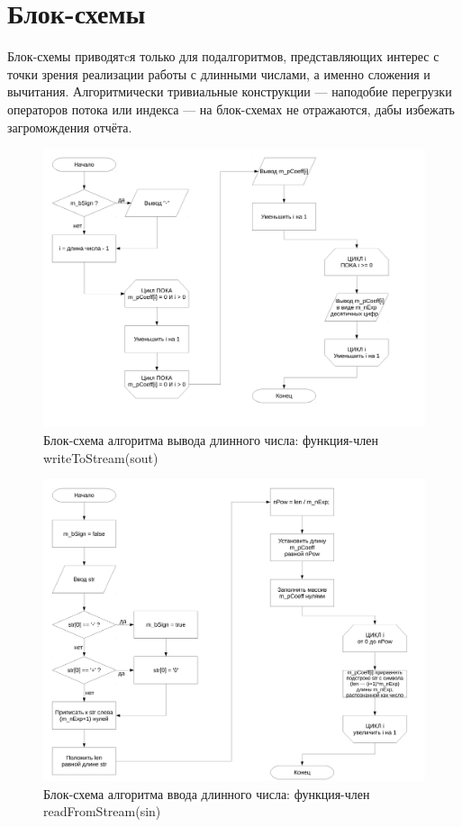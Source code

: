 \documentclass[a4paper,12pt]{article} %
\begin{document}



\section*{Блок-схемы}

Блок-схемы приводятcя только для подалгоритмов, представляющих интерес с точки зрения реализации работы с длинными числами,
а именно сложения и вычитания.
Алгоритмически тривиальные конструкции --- наподобие перегрузки операторов потока или индекса --- на блок-схемах не отражаются,
дабы избежать загромождения отчёта.

\begin{figure}[ht]
	\includegraphics[width=\textwidth]{lr1_writeToStream.pdf}
	\caption{Блок-схема алгоритма вывода длинного числа: функция-член writeToStream(sout)}
\end{figure}

\begin{figure}[ht]
	\includegraphics[width=\textwidth]{lr1_readFromStream.pdf}
	\caption{Блок-схема алгоритма ввода длинного числа: функция-член readFromStream(sin)}
\end{figure}
\end{document}
